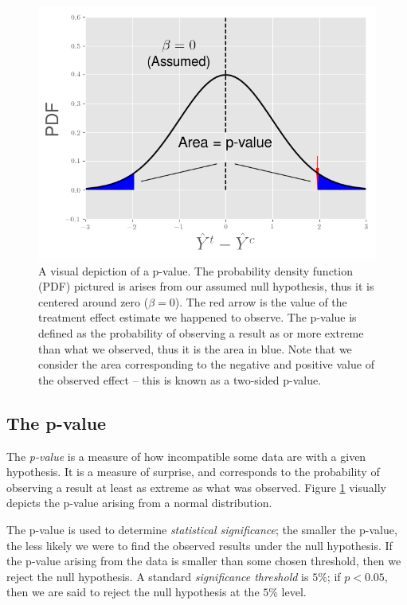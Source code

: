 \documentclass{tufte-handout}
\begin{document}
\begin{figure}[!ht]
  \includegraphics{./images/p-val2}
  \caption{A visual depiction of a p-value. The probability density
  function (PDF) pictured is arises from our assumed null hypothesis,
  thus it is centered around zero ($\beta=0$). The red arrow is the
  value of the treatment effect estimate we happened to observe.
  The p-value is defined as the probability of observing a result as or
  more extreme than what we observed, thus it is the area in blue.
  Note that we consider the area corresponding to the negative and
  positive value of the observed effect -- this is known as a two-sided
  p-value.}
  \label{fig:p-value}
\end{figure}

\subsection{The p-value}
\label{sec:orgacd8b3d}
The \emph{p-value} is a measure of how incompatible some data are with a given
hypothesis. It is a measure of surprise, and corresponds to the probability of
observing a result at least as extreme as what was observed. Figure
\ref{fig:p-value} visually depicts the p-value arising from a normal
distribution.

The p-value is used to determine \emph{statistical significance}; the smaller the
p-value, the less likely we were to find the observed results under the null
hypothesis. If the p-value arising from the data is smaller than some chosen
threshold, then we reject the null hypothesis. A standard \emph{significance
threshold} is \(5\%\); if \(p<0.05\), then we are said to reject the null hypothesis
at the \(5\%\) level.
\end{document}
